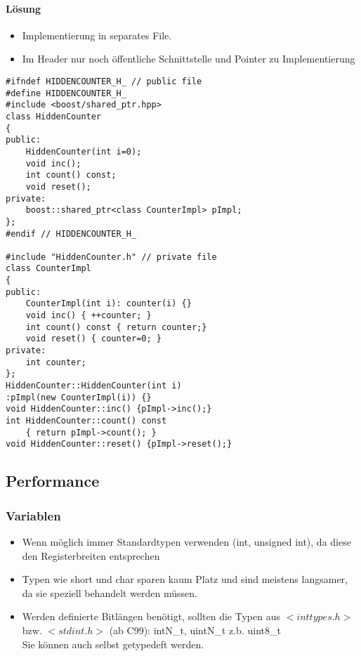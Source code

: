 \paragraph{Lösung}
\begin{itemize}
\item Implementierung in separates File.
\item Im Header nur noch öffentliche Schnittstelle und Pointer zu Implementierung
\end{itemize}

\begin{lstlisting}
#ifndef HIDDENCOUNTER_H_ // public file
#define HIDDENCOUNTER_H_
#include <boost/shared_ptr.hpp>
class HiddenCounter
{
public:
	HiddenCounter(int i=0);
	void inc();
	int count() const;
	void reset();
private:
	boost::shared_ptr<class CounterImpl> pImpl;
};
#endif // HIDDENCOUNTER_H_

#include "HiddenCounter.h" // private file
class CounterImpl
{
public:
	CounterImpl(int i): counter(i) {}
	void inc() { ++counter; }
	int count() const { return counter;}
	void reset() { counter=0; }
private:
	int counter;
};
HiddenCounter::HiddenCounter(int i)
:pImpl(new CounterImpl(i)) {}
void HiddenCounter::inc() {pImpl->inc();}
int HiddenCounter::count() const
	{ return pImpl->count(); }
void HiddenCounter::reset() {pImpl->reset();}
\end{lstlisting}


\subsection{Performance}

\subsubsection{Variablen}
\begin{itemize}
	\item Wenn möglich immer Standardtypen verwenden (int, unsigned int), da
		diese den Registerbreiten entsprechen
	\item Typen wie short und char sparen kaum Platz und sind meistens
		langsamer, da sie speziell behandelt werden müssen.
	\item Werden definierte Bitlängen benötigt, sollten die Typen aus
		$<inttypes.h>$ bzw. $<stdint.h>$ (ab C99): 
		intN\_t,  uintN\_t z.b. uint8\_t \\
		Sie können auch selbst getypedeft werden.
\end{itemize}

